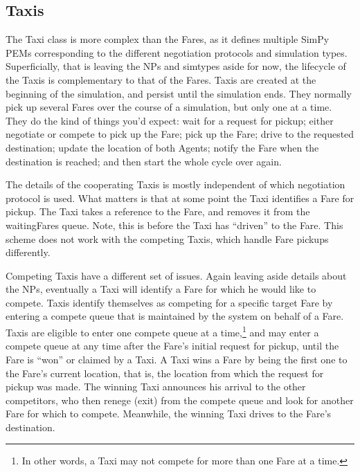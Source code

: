\documentclass[11pt,letterpaper,onecolumn,twoside,openright,final]{report}
\begin{document}
\subsection{Taxis}
The Taxi class is more complex than the Fares, as it defines multiple SimPy PEMs corresponding to the different negotiation protocols and simulation types.
Superficially, that is leaving the NPs and simtypes aside for now, the lifecycle of the Taxis is complementary to that of the Fares.
Taxis are created at the beginning of the simulation, and persist until the simulation ends.
They normally pick up several Fares over the course of a simulation, but only one at a time.
They do the kind of things you'd expect: wait for a request for pickup; either negotiate or compete to pick up the Fare; pick up the Fare; drive to the requested destination; update the location of both Agents; notify the Fare when the destination is reached; and then start the whole cycle over again.

The details of the cooperating Taxis is mostly independent of which negotiation protocol is used.
What matters is that at some point the Taxi identifies a Fare for pickup.
The Taxi takes a reference to the Fare, and removes it from the waitingFares queue.
Note, this is before the Taxi has ``driven'' to the Fare.
This scheme does not work with the competing Taxis, which handle Fare pickups differently.

Competing Taxis have a different set of issues.
Again leaving aside details about the NPs, eventually a Taxi will identify a Fare for which he would like to compete.
Taxis identify themselves as competing for a specific target Fare by entering a compete queue that is maintained by the system on behalf of a Fare.
Taxis are eligible to enter one compete queue at a time,\footnote{In other words, a Taxi may not compete for more than one Fare at a time.} and may enter a compete queue at any time after the Fare's initial request for pickup, until the Fare is ``won'' or claimed by a Taxi.
A Taxi wins a Fare by being the first one to the Fare's current location, that is, the location from which the request for pickup was made.
The winning Taxi announces his arrival to the other competitors, who then renege (exit) from the compete queue and look for another Fare for which to compete.
Meanwhile, the winning Taxi drives to the Fare's destination.
\end{document}
